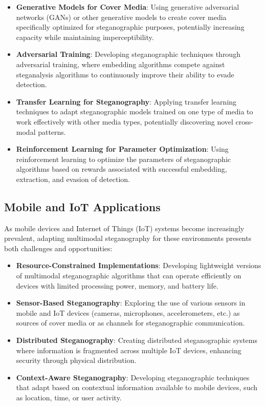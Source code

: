 \documentclass[12pt, a4paper, oneside]{book}
\begin{document}
\begin{itemize}[leftmargin=*]
    \item \textbf{Generative Models for Cover Media}: Using generative adversarial networks (GANs) or other generative models to create cover media specifically optimized for steganographic purposes, potentially increasing capacity while maintaining imperceptibility.

    \item \textbf{Adversarial Training}: Developing steganographic techniques through adversarial training, where embedding algorithms compete against steganalysis algorithms to continuously improve their ability to evade detection.

    \item \textbf{Transfer Learning for Steganography}: Applying transfer learning techniques to adapt steganographic models trained on one type of media to work effectively with other media types, potentially discovering novel cross-modal patterns.

    \item \textbf{Reinforcement Learning for Parameter Optimization}: Using reinforcement learning to optimize the parameters of steganographic algorithms based on rewards associated with successful embedding, extraction, and evasion of detection.
\end{itemize}

\subsection{Mobile and IoT Applications}

As mobile devices and Internet of Things (IoT) systems become increasingly prevalent, adapting multimodal steganography for these environments presents both challenges and opportunities:

\begin{itemize}[leftmargin=*]
    \item \textbf{Resource-Constrained Implementations}: Developing lightweight versions of multimodal steganographic algorithms that can operate efficiently on devices with limited processing power, memory, and battery life.

    \item \textbf{Sensor-Based Steganography}: Exploring the use of various sensors in mobile and IoT devices (cameras, microphones, accelerometers, etc.) as sources of cover media or as channels for steganographic communication.

    \item \textbf{Distributed Steganography}: Creating distributed steganographic systems where information is fragmented across multiple IoT devices, enhancing security through physical distribution.

    \item \textbf{Context-Aware Steganography}: Developing steganographic techniques that adapt based on contextual information available to mobile devices, such as location, time, or user activity.
\end{itemize}
\end{document}
